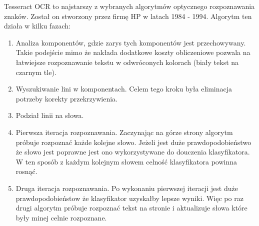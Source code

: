 Tesseract OCR to najstarszy z wybranych algorytmów optycznego rozpoznawania znaków.
Został on stworzony przez firmę HP w latach 1984 - 1994.
Algorytm ten działa w kilku fazach:
\begin{enumerate}
    \item Analiza komponentów, gdzie zarys tych komponentów jest przechowywany. 
        Takie podejście mimo że nakłada dodatkowe koszty obliczeniowe pozwala na łatwiejsze rozpoznawanie 
        tekstu w odwróconych kolorach (biały tekst na czarnym tle)\cite{smith2007}.
    \item Wyszukiwanie lini w komponentach. 
        Celem tego kroku była eliminacja potrzeby korekty przekrzywienia.
    \item Podział linii na słowa.
    \item Pierwsza iteracja rozpoznawania. 
        Zaczynając na górze strony algorytm próbuje rozpoznać każde kolejne słowo. Jeżeli jest duże prawdopodobieństwo
        że słowo jest poprawne jest ono wykorzystywane do douczenia klasyfikatora. W ten sposób z każdym kolejnym słowem
        celność klasyfikatora powinna rosnąć.
    \item Druga iteracja rozpoznawania.
        Po wykonaniu pierwszej iteracji jest duże prawdopodobieństow że klasyfikator uzyskałby lepsze wyniki. Więc
        po raz drugi algorytm próbuje rozpoznać tekst na stronie i aktualizuje słowa które były minej celnie rozpoznane.

\end{enumerate}
